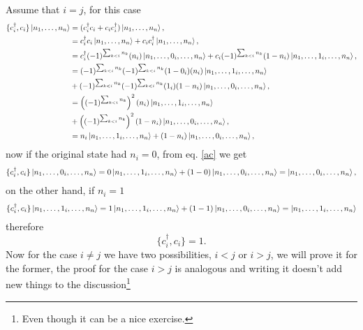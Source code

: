 Assume that $i=j$, for this case
\begin{equation}
  \begin{aligned}[b]
    \{c_i^\dagger, c_i\}\ket{n_1,\ldots,n_n} &= (c_i^\dagger c_i + c_i c_i^\dagger)\ket{n_1,\ldots,n_n}, \\
    &= c_i^\dagger c_i \ket{n_1,\ldots,n_n} + c_i c_i^\dagger \ket{n_1,\ldots,n_n},\\
    &= c_i^\dagger (-1)^{\sum_{k<i}n_k}(n_i)\ket{n_1,\ldots,0_i,\ldots,n_n} + c_i (-1)^{\sum_{k<i}n_k}(1-n_i) \ket{n_1,\ldots,1_i,\ldots,n_n},\\
    &=  (-1)^{\sum_{k<i}n_k}(-1)^{\sum_{k<i}n_k}(1-0_i)(n_i)\ket{n_1,\ldots,1_i,\ldots,n_n} \\&+  (-1)^{\sum_{k<i}n_k}(-1)^{\sum_{k<i}n_k}(1_i)(1-n_i) \ket{n_1,\ldots,0_i,\ldots,n_n},\\
    &=  \left((-1)^{\sum_{k<i}n_k}\right)^2(n_i)\ket{n_1,\ldots,1_i,\ldots,n_n} \\&+  \left((-1)^{\sum_{k<i}n_k}\right)^2(1-n_i) \ket{n_1,\ldots,0_i,\ldots,n_n},\\
    &=  n_i\ket{n_1,\ldots,1_i,\ldots,n_n} + (1-n_i) \ket{n_1,\ldots,0_i,\ldots,n_n},
  \end{aligned}\label{ac}
\end{equation}
now if the original state had $n_i = 0$, from eq. \ref{ac} we get \begin{equation}
  \begin{aligned}[b]
    \{c_i^\dagger, c_i\}\ket{n_1,\ldots,0_i,\ldots,n_n}
    =  0\ket{n_1,\ldots,1_i,\ldots,n_n} + (1-0) \ket{n_1,\ldots,0_i,\ldots,n_n} =  \ket{n_1,\ldots,0_i,\ldots,n_n},
  \end{aligned}
\end{equation}
on the other hand, if $n_i = 1$
\begin{equation}
\begin{aligned}[b]
  \{c_i^\dagger, c_i\}\ket{n_1,\ldots,1_i,\ldots,n_n}
  =  1\ket{n_1,\ldots,1_i,\ldots,n_n} + (1-1) \ket{n_1,\ldots,0_i,\ldots,n_n} = \ket{n_1,\ldots,1_i,\ldots,n_n}
\end{aligned}
\end{equation}
therefore
\begin{equation}
  \{c_i^\dagger, c_i\} = 1.\label{31}
\end{equation}
Now for the case $i\neq j$ we have two possibilities, $i<j$ or $i>j$, we will prove it for the former, the proof for the case $i>j$ is analogous and writing it doesn't add new things to the discussion\footnote{Even though it can be a nice exercise.}
